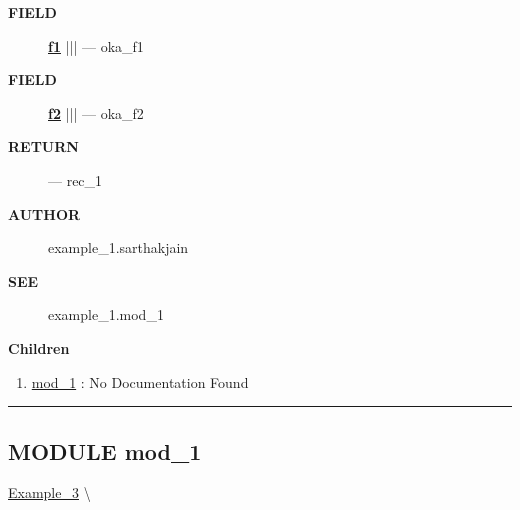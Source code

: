 \par
\begin{description}
\item [\colorbox{tagtype}{\color{white} \textbf{\textsf{FIELD}}}] \textbf{\underline{f1}} |||  --- oka\_f1
\item [\colorbox{tagtype}{\color{white} \textbf{\textsf{FIELD}}}] \textbf{\underline{f2}} |||  --- oka\_f2
\end{description}






\par
\begin{description}
\item [\colorbox{tagtype}{\color{white} \textbf{\textsf{RETURN}}}] \textbf{} --- rec\_1
\end{description}







\par
\begin{description}
\item [\colorbox{tagtype}{\color{white} \textbf{\textsf{AUTHOR}}}] example\_1.sarthakjain
\end{description}






\par
\begin{description}
\item [\colorbox{tagtype}{\color{white} \textbf{\textsf{SEE}}}] example\_1.mod\_1
\end{description}



\textbf{Children}
\begin{enumerate}
\item \hyperlink{ecldoc:Example_3.mod_1}{mod\_1}
: No Documentation Found
\end{enumerate}

\rule{\linewidth}{0.5pt}

\subsection*{\textsf{\colorbox{headtoc}{\color{white} MODULE}
mod\_1}}

\hypertarget{ecldoc:Example_3.mod_1}{}
\hspace{0pt} \hyperlink{ecldoc:Example_3}{Example_3} \textbackslash 

